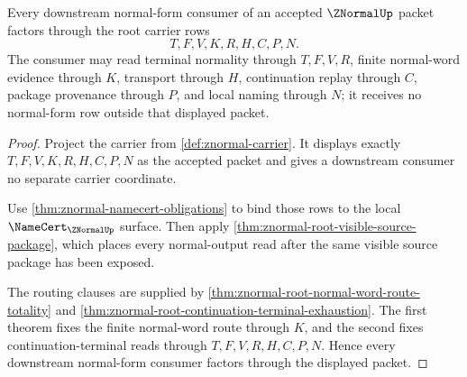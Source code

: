 \begin{theorem}
\label{thm:znormal-root-downstream-totality}
Every downstream normal-form consumer of an accepted $\ZNormalUp$ packet factors through the root carrier rows
$$
T,F,V,K,R,H,C,P,N.
$$
The consumer may read terminal normality through $T,F,V,R$, finite normal-word evidence through $K$, transport through $H$, continuation replay through $C$, package provenance through $P$, and local naming through $N$; it receives no normal-form row outside that displayed packet.
\end{theorem}
\begin{proof}
Project the carrier from \autoref{def:znormal-carrier}. It displays exactly $T,F,V,K,R,H,C,P,N$ as the accepted packet and gives a downstream consumer no separate carrier coordinate.

Use \autoref{thm:znormal-namecert-obligations} to bind those rows to the local $\NameCert_{\ZNormalUp}$ surface. Then apply \autoref{thm:znormal-root-visible-source-package}, which places every normal-output read after the same visible source package has been exposed.

The routing clauses are supplied by \autoref{thm:znormal-root-normal-word-route-totality} and \autoref{thm:znormal-root-continuation-terminal-exhaustion}. The first theorem fixes the finite normal-word route through $K$, and the second fixes continuation-terminal reads through $T,F,V,R,H,C,P,N$. Hence every downstream normal-form consumer factors through the displayed packet.
\end{proof}

